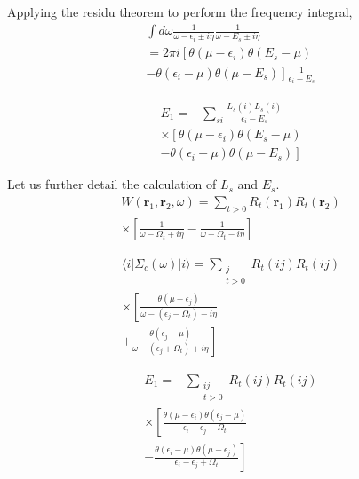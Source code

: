 \documentclass[aps,prb,reprint,showpacs]{revtex4-1}
\def\br{\mathbf{r}}
\begin{document}
Applying the residu theorem to perform the frequency integral,
\begin{multline}
 \int d\omega \frac{1}{\omega - \epsilon_i \pm i\eta} \frac{1}{\omega - E_s \pm i\eta} \\
   = 
    2 \pi i \left[ \theta(\mu - \epsilon_i)\theta(E_s-\mu) \right. 
    \\ \left.
    - \theta(\epsilon_i-\mu)\theta(\mu-E_s) \right]
        \frac{1}{\epsilon_i - E_s}
\end{multline}

\begin{multline}
 E_1 = -\sum_{si} \frac{L_s(i) L_s(i)}{\epsilon_i - E_s} \\
     \times \left[ \theta(\mu - \epsilon_i)\theta(E_s-\mu) 
\right.  \\ \left.
    - \theta(\epsilon_i-\mu)\theta(\mu-E_s) \right]
\end{multline}

Let us further detail the calculation of $L_s$ and $E_s$.
\begin{multline}
 W(\br_1,\br_2,\omega) = \sum_{t>0} R_t(\br_1) R_t(\br_2) \\
   \times \left[ 
                \frac{1}{\omega-\Omega_t +i \eta} 
               -\frac{1}{\omega+\Omega_t -i \eta} 
           \right]
\end{multline}

\begin{multline}
 \langle i | \Sigma_c(\omega) | i \rangle =
     \sum_{ \substack{j \\ t>0 } }  R_t(i j) R_t( i j) \\
   \times \left[
           \frac{ \theta(\mu - \epsilon_j) } { \omega - (\epsilon_j - \Omega_t ) - i\eta } 
\right.  \\ \left.
          +\frac{ \theta(\epsilon_j - \mu) } { \omega - (\epsilon_j + \Omega_t ) + i\eta }
          \right]
\end{multline}

\begin{multline}
E_1 = 
 -\sum_{\substack{i j \\ t>0 } } R_t(i j) R_t(i j) \\
     \times \left[ 
 \frac{ \theta(\mu - \epsilon_i)\theta(\epsilon_j-\mu) }
      { \epsilon_i - \epsilon_j - \Omega_t }
\right.  \\ \left.
    - \frac{ \theta(\epsilon_i-\mu)\theta(\mu-\epsilon_j)  }
      { \epsilon_i - \epsilon_j + \Omega_t } 
   \right]
\end{multline}
\end{document}

